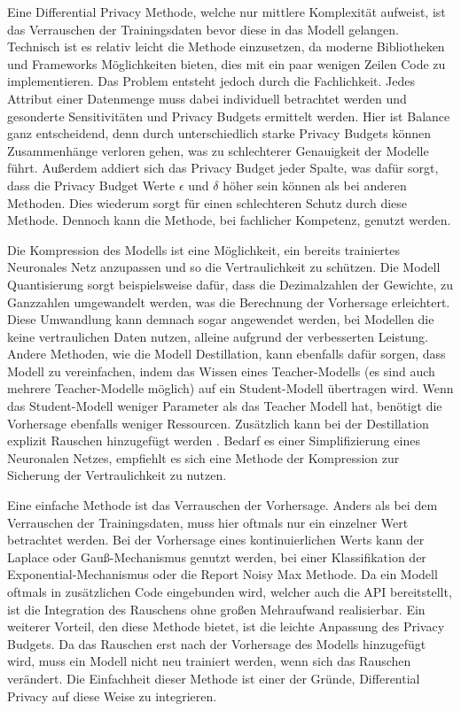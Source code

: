 Eine Differential Privacy Methode, welche nur mittlere Komplexität aufweist, ist das Verrauschen der Trainingsdaten bevor diese in das Modell gelangen.
Technisch ist es relativ leicht die Methode einzusetzen, da moderne Bibliotheken und Frameworks Möglichkeiten bieten, dies mit ein paar wenigen Zeilen Code zu implementieren.
Das Problem entsteht jedoch durch die Fachlichkeit. 
Jedes Attribut einer Datenmenge muss dabei individuell betrachtet werden und gesonderte Sensitivitäten und Privacy Budgets ermittelt werden.
Hier ist Balance ganz entscheidend, denn durch unterschiedlich starke Privacy Budgets können Zusammenhänge verloren gehen, was zu schlechterer Genauigkeit der Modelle führt.
Außerdem addiert sich das Privacy Budget jeder Spalte, was dafür sorgt, dass die Privacy Budget Werte $\epsilon$ und $\delta$ höher sein können als bei anderen Methoden.
Dies wiederum sorgt für einen schlechteren Schutz durch diese Methode.
Dennoch kann die Methode, bei fachlicher Kompetenz, genutzt werden.

Die Kompression des Modells ist eine Möglichkeit, ein bereits trainiertes Neuronales Netz anzupassen und so die Vertraulichkeit zu schützen.
Die Modell Quantisierung sorgt beispielsweise dafür, dass die Dezimalzahlen der Gewichte, zu Ganzzahlen umgewandelt werden, was die Berechnung der Vorhersage erleichtert.
Diese Umwandlung kann demnach sogar angewendet werden, bei Modellen die keine vertraulichen Daten nutzen, alleine aufgrund der verbesserten Leistung.
Andere Methoden, wie die Modell Destillation, kann ebenfalls dafür sorgen, dass Modell zu vereinfachen, indem das Wissen eines Teacher-Modells (es sind auch mehrere Teacher-Modelle möglich) auf ein Student-Modell übertragen wird.
Wenn das Student-Modell weniger Parameter als das Teacher Modell hat, benötigt die Vorhersage ebenfalls weniger Ressourcen.
Zusätzlich kann bei der Destillation explizit Rauschen hinzugefügt werden \cite{P-64}.
Bedarf es einer Simplifizierung eines Neuronalen Netzes, empfiehlt es sich eine Methode der Kompression zur Sicherung der Vertraulichkeit zu nutzen.

Eine einfache Methode ist das Verrauschen der Vorhersage.
Anders als bei dem Verrauschen der Trainingsdaten, muss hier oftmals nur ein einzelner Wert betrachtet werden.
Bei der Vorhersage eines kontinuierlichen Werts kann der Laplace oder Gauß-Mechanismus genutzt werden, bei einer Klassifikation der Exponential-Mechanismus oder die Report Noisy Max Methode.
Da ein Modell oftmals in zusätzlichen Code eingebunden wird, welcher auch die API bereitstellt, ist die Integration des Rauschens ohne großen Mehraufwand realisierbar.
Ein weiterer Vorteil, den diese Methode bietet, ist die leichte Anpassung des Privacy Budgets.
Da das Rauschen erst nach der Vorhersage des Modells hinzugefügt wird, muss ein Modell nicht neu trainiert werden, wenn sich das Rauschen verändert.
Die Einfachheit dieser Methode ist einer der Gründe, Differential Privacy auf diese Weise zu integrieren.

